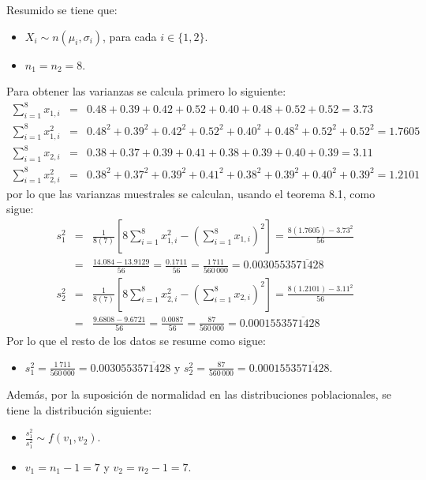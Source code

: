 \begin{solucion}
 \begin{datos}
  Resumido se tiene que:
  \begin{itemize}
   \item $X_i \sim n\left( \mu_i, \sigma_i \right)$, para cada $i \in \{1,2\}$.
   \item $n_1 = n_2 = 8$.
  \end{itemize}
  Para obtener las varianzas se calcula primero lo siguiente:
  \begin{eqnarray*}
   \sum_{i=1}^{8} x_{1,i} & = &
   0.48 + 0.39 + 0.42 + 0.52 + 0.40 + 0.48 + 0.52 + 0.52 = 3.73 \\
   \sum_{i=1}^{8} x_{1,i}^2 & = & 
   0.48^2 + 0.39^2 + 0.42^2 + 0.52^2 + 0.40^2 + 0.48^2 + 0.52^2 + 0.52^2
   = 1.7605 \\
   \sum_{i=1}^{8} x_{2,i} & = &
   0.38 + 0.37 + 0.39 + 0.41 + 0.38 + 0.39 + 0.40 + 0.39 = 3.11 \\
   \sum_{i=1}^{8} x_{2,i}^2 & = &
   0.38^2 + 0.37^2 + 0.39^2 + 0.41^2 + 0.38^2 + 0.39^2 + 0.40^2 + 0.39^2
   = 1.2101
  \end{eqnarray*}
  por lo que las varianzas muestrales se calculan, usando el teorema 8.1,
  como sigue:
  \begin{eqnarray*}
   s_1^2 & = &
   \frac{1}{8(7)}
   \left[ 8\sum_{i=1}^8 x_{1,i}^2 -
   \left( \sum_{i=1}^8 x_{1,i} \right)^2 \right]
   = \frac{8(1.7605) - 3.73^2}{56} \\
   & = & \frac{14.084 - 13.9129}{56} = \frac{0.1711}{56}
   = \frac{1\,711}{560\,000} = 0.0030553\overline{571428} \\
   s_2^2 & = &
   \frac{1}{8(7)}
   \left[ 8\sum_{i=1}^8 x_{2,i}^2 -
   \left( \sum_{i=1}^8 x_{2,i} \right)^2 \right]
   = \frac{8(1.2101) - 3.11^2}{56} \\
   & = & \frac{9.6808 - 9.6721}{56}
   = \frac{0.0087}{56} = \frac{87}{560\,000} = 0.0001553\overline{571428}
  \end{eqnarray*}
  Por lo que el resto de los datos se resume como sigue:
  \begin{itemize}
   \item $s_1^2 = \frac{1\,711}{560\,000} = 0.0030553\overline{571428}$
   y $s_2^2 = \frac{87}{560\,000} = 0.0001553\overline{571428}$.
  \end{itemize}
  Adem\'as, por la suposici\'on de normalidad en las distribuciones
  poblacionales, se tiene la distribuci\'on siguiente:
  \begin{itemize}
   \item $\frac{s_1^2}{s_1^2} \sim f(v_1,v_2)$.
   \item $v_1 = n_1 - 1 = 7$ y $v_2 = n_2 - 1 = 7$.
  \end{itemize}
 \end{datos}
 

\end{solucion}
